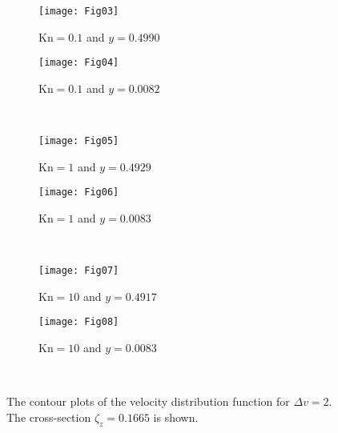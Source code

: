 \documentclass[]{elsarticle} %
\newcommand{\Kn}{\mathrm{Kn}}
\begin{document}
\begin{figure}
    \centering
    \begin{subfigure}[b]{.5\linewidth}
        \texttt{[image: Fig03]}
        \caption{\(\Kn=0.1\) and \(y=0.4990\)}
        \label{fig:distrib-kn0.1:boundary}
    \end{subfigure}%
    \begin{subfigure}[b]{.5\linewidth}
        \texttt{[image: Fig04]}
        \caption{\(\Kn=0.1\) and \(y=0.0082\)}
        \label{fig:distrib-kn0.1:center}
    \end{subfigure}\\
    \begin{subfigure}[b]{.5\linewidth}
        \texttt{[image: Fig05]}
        \caption{\(\Kn=1\) and \(y=0.4929\)}
        \label{fig:distrib-kn1.0:boundary}
    \end{subfigure}%
    \begin{subfigure}[b]{.5\linewidth}
        \texttt{[image: Fig06]}
        \caption{\(\Kn=1\) and \(y=0.0083\)}
        \label{fig:distrib-kn1.0:center}
    \end{subfigure}\\
    \begin{subfigure}[b]{.5\linewidth}
        \texttt{[image: Fig07]}
        \caption{\(\Kn=10\) and \(y=0.4917\)}
        \label{fig:distrib-kn10:boundary}
    \end{subfigure}%
    \begin{subfigure}[b]{.5\linewidth}
        \texttt{[image: Fig08]}
        \caption{\(\Kn=10\) and \(y=0.0083\)}
        \label{fig:distrib-kn10:center}
    \end{subfigure}\\
    \caption{The contour plots of the velocity distribution function for \(\Delta{v}=2\).
        The cross-section \(\zeta_z=0.1665\) is shown.}
    \label{fig:distrib}
\end{figure}
\end{document}
